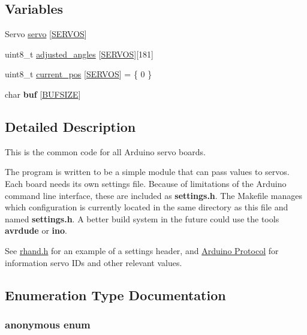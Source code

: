 \subsection*{Variables}
\begin{DoxyCompactItemize}
\item 
Servo \hyperlink{servo_8ino_adf02be48d17da3f4a229ebfdfda2fa71}{servo} \mbox{[}\hyperlink{rhand_8h_a7baed4559391f95790fea2b456a22b68}{S\+E\+R\+V\+O\+S}\mbox{]}
\item 
uint8\+\_\+t \hyperlink{servo_8ino_afb7b19d5ec5c1046df4a261ca4ee9f70}{adjusted\+\_\+angles} \mbox{[}\hyperlink{rhand_8h_a7baed4559391f95790fea2b456a22b68}{S\+E\+R\+V\+O\+S}\mbox{]}\mbox{[}181\mbox{]}
\item 
uint8\+\_\+t \hyperlink{servo_8ino_ae88c6e452cc6a2dc7af59897c42d8e1e}{current\+\_\+pos} \mbox{[}\hyperlink{rhand_8h_a7baed4559391f95790fea2b456a22b68}{S\+E\+R\+V\+O\+S}\mbox{]} = \{ 0 \}
\item 
\hypertarget{servo_8ino_ac95651d79c608a3148973b5b1fc9e525}{}char {\bfseries buf} \mbox{[}\hyperlink{rhand_8h_aeca034f67218340ecb2261a22c2f3dcd}{B\+U\+F\+S\+I\+Z\+E}\mbox{]}\label{servo_8ino_ac95651d79c608a3148973b5b1fc9e525}

\end{DoxyCompactItemize}


\subsection{Detailed Description}
This is the common code for all Arduino servo boards.

The program is written to be a simple module that can pass values to servos. Each board needs its own settings file. Because of limitations of the Arduino command line interface, these are included as {\bfseries settings.\+h}. The Makefile manages which configuration is currently located in the same directory as this file and named {\bfseries settings.\+h}. A better build system in the future could use the tools {\bfseries avrdude} or {\bfseries ino}.

See \hyperlink{rhand_8h}{rhand.\+h} for an example of a settings header, and \hyperlink{index_Arduino}{Arduino Protocol} for information servo I\+Ds and other relevant values. 

\subsection{Enumeration Type Documentation}
\hypertarget{servo_8ino_a99fb83031ce9923c84392b4e92f956b5}{}\subsubsection[{anonymous enum}]{\setlength{\rightskip}{0pt plus 5cm}anonymous enum}\label{servo_8ino_a99fb83031ce9923c84392b4e92f956b5}


